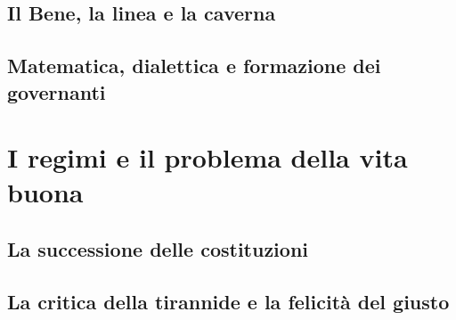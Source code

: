 \subsection{Il Bene, la linea e la caverna}

\subsection{Matematica, dialettica e formazione dei governanti}

\section{I regimi e il problema della vita buona}

\subsection{La successione delle costituzioni}

\subsection{La critica della tirannide e la felicità del giusto}
